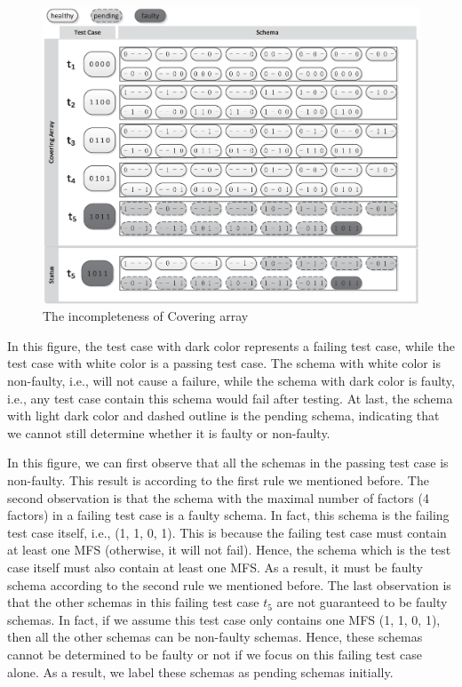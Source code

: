 \begin{figure}[!ht]
 \centering
 \includegraphics[width=5.6in]{ca.eps}
 \caption{The incompleteness of Covering array }
 \label{fig_inc_ca}
\end{figure}

In this figure, the test case with dark color represents a failing test case, while the test case with white color is a passing test case. The schema with white color is non-faulty, i.e., will not cause a failure, while the schema with dark color is faulty, i.e., any test case contain this schema would fail after testing. At last, the schema with light dark color and dashed outline is the pending schema, indicating that we cannot still determine whether it is faulty or non-faulty.

In this figure, we can first observe that all the schemas in the passing test case is non-faulty. This result is according to the first rule we mentioned before. The second observation is that the schema with the maximal number of factors (4 factors) in a failing test case is a faulty schema. In fact, this schema is the failing test case itself, i.e., (1, 1, 0, 1). This is because the failing test case must contain at least one MFS (otherwise, it will not fail). Hence, the schema which is the test case itself must also contain at least one MFS. As a result, it must be faulty schema according to the second rule we mentioned before. The last observation is that the other schemas in this failing test case $t_{5}$ are not guaranteed to be faulty schemas. In fact, if we assume this test case only contains one MFS (1, 1, 0, 1), then all the other schemas can be non-faulty schemas. Hence, these schemas cannot be determined to be faulty or not if we focus on this failing test case alone. As a result, we label these schemas as pending schemas initially.

